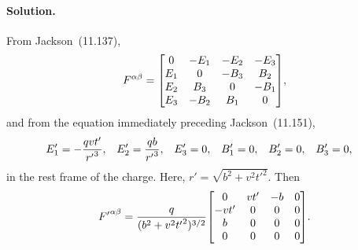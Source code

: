 \documentclass[11pt]{article}
\newcommand{\beqn}{\begin{equation}}
\newcommand{\eeqn}{\end{equation}}
\newenvironment{solution}
{
	\paragraph{Solution.}
	\ignorespaces
}
{
    \bigskip
}
\begin{document}
\newcommand{\Fmat}{\mqty[	0 & -\Eq & -\Ew & -\Ee \\
						\Eq & 0 & -\Be & \Bw \\
						\Ew & \Be & 0 & -\Bq \\
						\Ee & -\Bw & \Bq & 0 ]}
\newcommand{\Fpab}{{F'}^{\alp\bet}}
\newcommand{\rp}{{r'}}
\newcommand{\tLam}{\tilde{\Lam}}

\begin{solution}
	From Jackson~(11.137),
	\beqn \label{F}
		\Fab = \Fmat,
	\eeqn
	and from the equation immediately preceding Jackson~(11.151),
	\begin{align*}
		\Eq' &= -\frac{q v t'}{\rp^3}, &
		\Ew' &= \frac{q b}{\rp^3}, &
		\Ee' &= 0, &
		\Bq' &= 0, &
		\Bw' &= 0, &
		\Be' &= 0,
	\end{align*}
	in the rest frame of the charge.  Here, $r' = \sqrt{b^2 + v^2 {t'}^2}$.  Then
	\beqn \label{thing2.1b}
		\Fpab = \frac{q}{(b^2 + v^2 {t'}^2)^{3/2}}
			\mqty[0 & v t' & -b & 0 \\
				-v t' & 0 & 0 & 0 \\
				b & 0 & 0 & 0 \\
				0 & 0 & 0 & 0 ].
	\eeqn
	

\end{solution}
\end{document}
